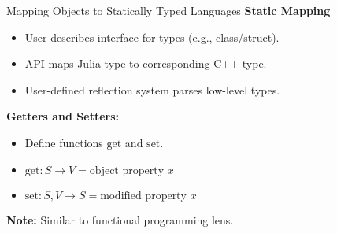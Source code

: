 
\begin{frame}{Mapping Objects to Statically Typed Languages}
    \textbf{Static Mapping}
    \begin{itemize}
        \item User describes interface for types (e.g., class/struct).
        \item API maps Julia type to corresponding C++ type.
        \item User-defined reflection system parses low-level types.
    \end{itemize}
    
    \vspace{0.5cm}
    \pause
    \textbf{Getters and Setters:}
    \begin{itemize}
        \item Define functions $\text{get}$ and $\text{set}$.
        \item $\text{get}: S \rightarrow V = \text{object property } x$
        \item $\text{set}: S, V \rightarrow S = \text{modified property } x$
    \end{itemize}
    
    \vspace{0.5cm}
    \pause
    \textbf{Note:} Similar to functional programming lens.
\end{frame}